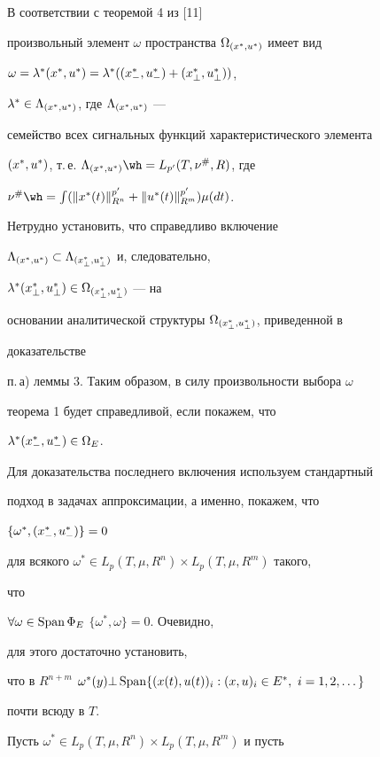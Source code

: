 \begin{pf} 


В соответствии с теоремой 4 из [11] 


произвольный элемент $\omega$ пространства $\Omega_{{(x^*_{},u^*_{})}}$ имеет вид 


$\omega=\lambda^*{(x^*_{},u^*_{})}=\lambda^*({(x^*_{-},u^*_{-})}+{(x^*_{\bot},u^*_{\bot})})$, 


$\lambda^*\in\Lambda_{{(x^*_{},u^*_{})}}$, где $\Lambda_{{(x^*_{},u^*_{})}}$ --- 


семейство всех сигнальных функций характеристического элемента 


${(x^*_{},u^*_{})}$, т.\,е. $\Lambda_{\myxu{}}\wh =L_{p'}(T,\nu^{\#},R)$, где 


$\nu^{\#}\wh =\int(\|x^*(t)\|^{p'}_{R^n}+\|u^*(t)\|^{p'}_{R^m})\mu(dt)$. 


Нетрудно установить, что справедливо включение 


$\Lambda_{{(x^*_{},u^*_{})}}\subset\Lambda_{{(x^*_{\bot},u^*_{\bot})}}$ и, следовательно,


$\lambda^*{(x^*_{\bot},u^*_{\bot})}\in\Omega_{{(x^*_{\bot},u^*_{\bot})}}$ --- на 


основании аналитической структуры $\Omega_{{(x^*_{\bot},u^*_{\bot})}}$, приведенной в 


доказательстве 


п.\,а) леммы 3. Таким образом, в силу произвольности выбора $\omega$


теорема 1 будет справедливой, если покажем, что 


$\lambda^*{(x^*_{-},u^*_{-})}\in\Omega_E$. 


Для доказательства последнего включения используем стандартный 


подход в задачах аппроксимации, а именно, покажем, что 


$\{\omega^*,{(x^*_{-},u^*_{-})}\}=0$ 


для всякого $\omega^*\in L_p(T,\mu,R^n)\times L_p(T,\mu,R^m)$ такого, 


что 


$\forall\omega\in\operatorname{Span}\Phi_E$ $\{\omega^*,\omega\}=0$. Очевидно,


для этого достаточно установить, 


что в $R^{n+m}$\; $\omega^*(y)\bot\Span\{(x(t),u(t))_i: (x,u)_i\in 


E^*,\ i=1,2,\dotsc\}$ 


почти всюду в $T$. 


 


Пусть $\omega^*\in L_p(T,\mu,R^n)\times L_p(T,\mu,R^m)$ и пусть 



\end{pf}
